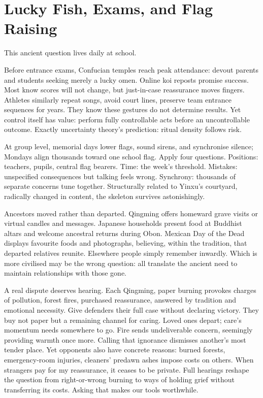 \section{Lucky Fish, Exams, and Flag Raising}
This ancient question lives daily at school.

Before entrance exams, Confucian temples reach peak attendance: devout parents and students seeking merely a lucky omen. Online koi reposts promise success. Most know scores will not change, but just-in-case reassurance moves fingers. Athletes similarly repeat songs, avoid court lines, preserve team entrance sequences for years. They know these gestures do not determine results. Yet control itself has value: perform fully controllable acts before an uncontrollable outcome. Exactly uncertainty theory's prediction: ritual density follows risk.

At group level, memorial days lower flags, sound sirens, and synchronise silence; Mondays align thousands toward one school flag. Apply four questions. Positions: teachers, pupils, central flag bearers. Time: the week's threshold. Mistakes: unspecified consequences but talking feels wrong. Synchrony: thousands of separate concerns tune together. Structurally related to Yinxu's courtyard, radically changed in content, the skeleton survives astonishingly.

Ancestors moved rather than departed. Qingming offers homeward grave visits or virtual candles and messages. Japanese households present food at Buddhist altars and welcome ancestral returns during Obon. Mexican Day of the Dead displays favourite foods and photographs, believing, within the tradition, that departed relatives reunite. Elsewhere people simply remember inwardly. Which is more civilised may be the wrong question: all translate the ancient need to maintain relationships with those gone.

A real dispute deserves hearing. Each Qingming, paper burning provokes charges of pollution, forest fires, purchased reassurance, answered by tradition and emotional necessity. Give defenders their full case without declaring victory. They buy not paper but a remaining channel for caring. Loved ones depart; care's momentum needs somewhere to go. Fire sends undeliverable concern, seemingly providing warmth once more. Calling that ignorance dismisses another's most tender place. Yet opponents also have concrete reasons: burned forests, emergency-room injuries, cleaners' predawn ashes impose costs on others. When strangers pay for my reassurance, it ceases to be private. Full hearings reshape the question from right-or-wrong burning to ways of holding grief without transferring its costs. Asking that makes our tools worthwhile.

